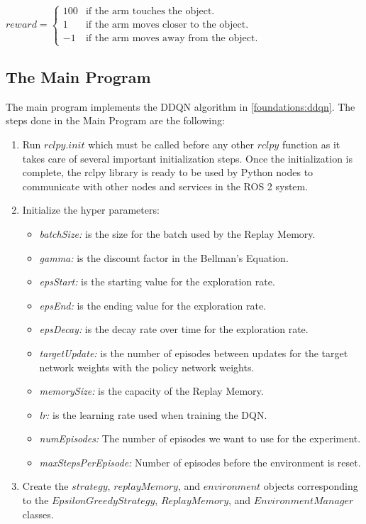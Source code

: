 \documentclass[12pt,oneside]{article}
\begin{document}
\begin{enumerate}
$reward = 
 \begin{cases} 
 	100 	& \text{if the arm touches the object.} \\ 
 	1 		& \text{if the arm moves closer to the object.} \\ 
 	-1 		& \text{if the arm moves away from the object.} 
 \end{cases}$
\end{enumerate}


\subsection{The Main Program}
The main program implements the DDQN algorithm in \ref{foundations:ddqn}. The steps done in the Main Program are the following:
\begin{enumerate}
\item Run $rclpy.init$ which must be called before any other $rclpy$ function as it takes care of several important initialization steps. Once the initialization is complete, the rclpy library is ready to be used by Python nodes to communicate with other nodes and services in the ROS 2 system.
\item  Initialize the hyper parameters:
\begin{itemize}
\item \textit{batchSize:} is the size for the batch used by the Replay Memory.
\item \textit{gamma:} is the discount factor in the Bellman's Equation.
\item \textit{epsStart:} is the starting value for the exploration rate.
\item \textit{epsEnd: } is the ending value for the exploration rate.
\item \textit{epsDecay:} is the decay rate over time for the exploration rate.
\item \textit{targetUpdate:} is the number of episodes between updates for the target network weights with the policy network weights.
\item \textit{memorySize:} is the capacity of the Replay Memory.
\item \textit{lr:} is the learning rate used when training the DQN.
\item \textit{numEpisodes:} The number of episodes we want to use for the experiment.
\item \textit{maxStepsPerEpisode:} Number of episodes before the environment is reset.
\end{itemize}
\item Create the $strategy$, $replayMemory$, and $environment$ objects corresponding to the $EpsilonGreedyStrategy$, $ReplayMemory$, and $EnvironmentManager$ classes.

\end{enumerate}
\end{document}
